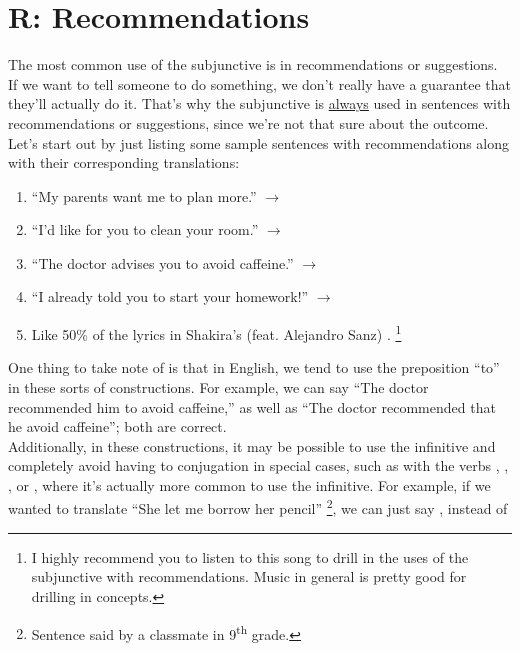 \section{R: Recommendations}

The most common use of the subjunctive is in recommendations or suggestions. \\

If we want to tell someone to do something, we don't really have a guarantee that they'll actually do it. That's why the subjunctive is \underline{always} used in sentences with recommendations or suggestions, since we're not that sure about the outcome.\\

Let's start out by just listing some sample sentences with recommendations along with their corresponding translations:
\begin{enumerate}[noitemsep]
	\item ``My parents want me to plan more.'' $\rightarrow$ 
	\item ``I'd like for you to clean your room.'' $\rightarrow$ 
	\item ``The doctor advises you to avoid caffeine.'' $\rightarrow$ 
	\item ``I already told you to start your homework!'' $\rightarrow$ 
	\item Like 50\% of the lyrics in Shakira's (feat. Alejandro Sanz) . \footnote{I highly recommend you to listen to this song to drill in the uses of the subjunctive with recommendations. Music in general is pretty good for drilling in concepts. }
\end{enumerate}

One thing to take note of is that in English, we tend to use the preposition ``to'' in these sorts of constructions. For example, we can say ``The doctor recommended him to avoid caffeine,'' as well as ``The doctor recommended that he avoid caffeine''; both are correct.\\ 

Additionally, in these constructions, it may be possible to use the infinitive and completely avoid having to conjugation in special cases, such as with the verbs ,  , , or , where it's actually more common to use the infinitive. For example, if we wanted to translate ``She let me borrow her pencil'' \footnote{Sentence said by a classmate in 9\textsuperscript{th} grade.}, we can just say , instead of 
